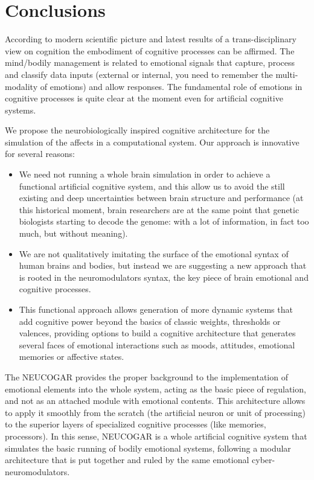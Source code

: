 \documentclass[procedia]{easychair}
\begin{document}
\section{Conclusions}
\label{sec:concl}

According to modern scientific picture  and latest results of a trans-disciplinary view on cognition
the embodiment of cognitive processes can be affirmed.
The mind/bodily management is related
to emotional signals that capture, process and classify data inputs (external or
internal, you need to remember the multi-modality of emotions) and allow responses.
The fundamental role of emotions in cognitive processes is quite clear at the moment even for
artificial cognitive systems.

We propose the neurobiologically inspired cognitive architecture for the simulation of the affects in
a computational system.
Our approach is innovative for several reasons:

\begin{itemize}
\item We need not running a whole brain simulation in order to achieve a functional
artificial cognitive system, and this allow us to avoid the still existing and deep
uncertainties between brain structure and performance
(at this historical moment, brain researchers are at the same point that genetic
biologists starting to decode the genome: with a lot of information, in fact too much,
but without meaning).
\item We are not qualitatively imitating the surface of the emotional syntax of
human brains and bodies, but instead we are suggesting a new approach that is
rooted in the neuromodulators syntax, the key piece of brain emotional and
cognitive processes.
\item This functional approach allows generation of more dynamic systems
that add cognitive power beyond the basics of classic weights, thresholds or
valences, providing options to build a cognitive architecture that generates several faces
of emotional interactions such as moods, attitudes, emotional memories or affective states.
\end{itemize}

The NEUCOGAR provides the proper background to the implementation of emotional elements into the whole system,
acting as the basic piece of regulation, and not as an attached module with emotional
contents. This architecture allows to apply it smoothly from the scratch (the artificial
neuron or unit of processing) to the superior layers of specialized cognitive processes
(like memories, processors). In this sense, NEUCOGAR is a whole artificial cognitive
system that simulates the basic running of bodily emotional systems, following
a modular architecture that is put together and ruled by the same
emotional cyber-neuromodulators.
\end{document}
